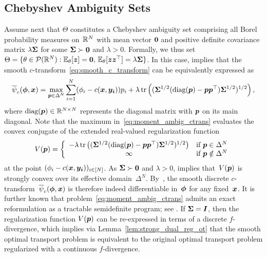 \documentclass[11pt, a4paper, oneside, reqno]{article}
\begin{document}
	\subsection{Chebyshev Ambiguity Sets}
	\label{sec:chebyshev}
	Assume next that $\Theta$ constitutes a Chebyshev ambiguity set comprising all Borel probability measures on~$\mathbb{R}^N$ with mean vector $\boldsymbol 0$ and positive definite covariance matrix $\lambda \boldsymbol \Sigma$ for some $\boldsymbol \Sigma\succ \boldsymbol 0$ and $\lambda> 0$. Formally, we thus set $\Theta = \{\theta \in \mathcal P(\mathbb{R}^N) : \mathbb{E}_\theta [\boldsymbol z] = \boldsymbol 0,\, \mathbb E_\theta [\boldsymbol z \boldsymbol z^\top] = \lambda \boldsymbol \Sigma\}$.
	In this case, \citep[Theorem~1]{ahipasaoglu2018convex} implies that the smooth $c$-transform~\eqref{eq:smooth_c_transform} can be equivalently expressed as
	\begin{equation}
	\label{eq:moment_ambig_ctrans}
	\overline\psi_c(\boldsymbol \phi, \boldsymbol x) = \max_{\boldsymbol p\in \Delta^N} \sum\limits_{i=1}^N(\phi_i -c(\boldsymbol x, \boldsymbol {y_i}))p_i + \lambda\,\textrm{tr}\left((\boldsymbol \Sigma^{1/2}(\textrm{diag}(\boldsymbol p)-\boldsymbol p\boldsymbol p^\top)\boldsymbol \Sigma^{1/2})^{1/2}\right),
	\end{equation}
	where $\textrm{diag}(\boldsymbol p)\in\mathbb{R}^{N\times N}$ represents the diagonal matrix with $\boldsymbol p$ on its main diagonal. Note that the maximum in~\eqref{eq:moment_ambig_ctrans} evaluates the convex conjugate of the extended real-valued regularization function
	\[
	    V(\boldsymbol p)=\left\{ \begin{array}{cl}
	         -\lambda\,\textrm{tr}\left((\boldsymbol \Sigma^{1/2}(\textrm{diag}(\boldsymbol p)-\boldsymbol p\boldsymbol p^\top)\boldsymbol \Sigma^{1/2})^{1/2}\right) & \text{if }\boldsymbol p\in\Delta^N \\
	         \infty & \text{if }\boldsymbol p\notin\Delta^N
	    \end{array}\right.
	\]
	at the point $(\phi_i -c(\boldsymbol x, \boldsymbol {y_i}))_{i\in [N]}$. As $\boldsymbol\Sigma\succ \boldsymbol 0$ and $\lambda>0$, \citep[Theorem~3]{ahipasaoglu2018convex} implies that~$V(\boldsymbol p)$ is strongly convex over its effective domain~$\Delta^N$. By~\cite[Proposition~12.60]{rockafellar2009variational}, the smooth discrete $c$-transform~$\overline\psi_c(\boldsymbol \phi, \boldsymbol x)$ is therefore indeed differentiable in~$\boldsymbol \phi$ for any fixed~$\boldsymbol x$. It is further known that problem~\eqref{eq:moment_ambig_ctrans} admits an exact reformulation as a tractable semidefinite program; see \citep[Proposition~1]{mishra2012choice}. If $\boldsymbol \Sigma = \boldsymbol I$, then the regularization function $V(\boldsymbol p)$ can be re-expressed in terms of a discrete $f$-divergence, which implies via Lemma~\ref{lem:strong_dual_reg_ot} that the smooth optimal transport problem is equivalent to the original optimal transport problem regularized with a continuous $f$-divergence.
	
\end{document}
